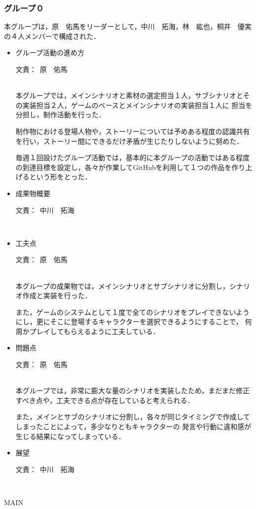 \documentclass[a4paper]{jarticle}
\newcommand{\resp}[1]{\begin{flushright}文責：~#1\end{flushright}~\\}
\begin{document}
\fi

\subsubsection{グループ０}
    
    本グループは，原　佑馬をリーダーとして，中川　拓海，林　紘也，桐井　優実の４人メンバーで構成された．

    \begin{itemize}
        \item グループ活動の進め方
        
        \resp{原　佑馬}

        本グループでは，メインシナリオと素材の選定担当１人，サブシナリオとその実装担当２人，ゲームのベースとメインシナリオの実装担当１人に
        担当を分担し，制作活動を行った．

        制作物における登場人物や，ストーリーについては予めある程度の認識共有を行い，ストーリー間にできるだけ矛盾が生じたりしないように努めた．

        毎週１回設けたグループ活動では，基本的に本グループの活動ではある程度の到達目標を設定し，各々が作業してGitHubを利用して１つの作品を作り上げるという形をとった．

        \item 成果物概要
        
        \resp{中川　拓海}


        \item 工夫点
        
        \resp{原　佑馬}

        本グループの成果物では，メインシナリオとサブシナリオに分割し，シナリオ作成と実装を行った．

        また，ゲームのシステムとして１度で全てのシナリオをプレイできないようにし，更にそこに登場するキャラクターを選択できるようにすることで，
        何周かプレイしてもらえるように工夫している．

        \item 問題点
        
        \resp{原　佑馬}

        本グループでは，非常に膨大な量のシナリオを実装したため，まだまだ修正すべき点や，工夫できる点が存在していると考えられる．

        また，メインとサブのシナリオに分割し，各々が同じタイミングで作成してしまったことによって，多少なりともキャラクターの
        発言や行動に違和感が生じる結果になってしまっている．

        \item 展望
        
        \resp{中川　拓海}


    \end{itemize}

\expandafter\ifx\csname MAIN \endcsname\relax
  
\end{document}
